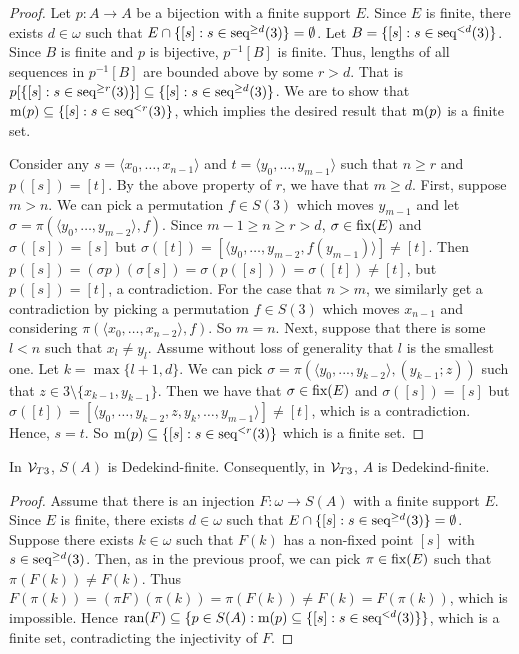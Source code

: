 \begin{proof}
Let $p:A\to A$ be a bijection with a finite support $E$. Since $E$ is finite, there exists $d\in\omega$ such that $E\cap\{[s]:s\in \textup{seq}^{\geq d}(3)\}=\emptyset$.
Let $B=\{[s]:s\in \textup{seq}^{< d}(3)\}$. Since $B$ is finite and $p$ is bijective, $p^{-1}[B]$ is finite. Thus, lengths of all sequences in $p^{-1}[B]$ are bounded above by some $r>d$. That is $p[\{[s]:s\in \textup{seq}^{\geq r}(3)\}]\subseteq \{[s]:s\in \textup{seq}^{\geq d}(3)\}$. We are to show that $\textup{m}(p)\subseteq\{[s]:s\in \textup{seq}^{<r}(3)\}$, which implies the desired result that $\textup{m}(p)$ is a finite set.

Consider any $s=\langle x_{0},\dotsc, x_{n-1}\rangle$ and $t=\langle y_{0},\dotsc, y_{m-1}\rangle$ such that $n\geq r$ and $p([s])=[t]$. By the above property of $r$, we have that $m\geq d$. First, suppose $m>n$. We can pick a permutation $f \in S(3)$ which moves $y_{m-1}$ and let $\sigma=\pi(\langle y_{0},\dotsc, y_{m-2}\rangle,f)$. Since $m-1\geq n\geq r>d$, $\sigma\in \textup{fix}(E)$ and $\sigma([s])=[s]$ but $\sigma([t])=[\langle y_{0},\dotsc,y_{m-2}, f(y_{m-1})\rangle]\neq [t]$. Then $p([s])=(\sigma p)(\sigma[s])=\sigma (p([s]))=\sigma([t])\neq [t]$, but $p([s])=[t]$, a contradiction. For the case that $n>m$, we similarly get a contradiction by picking a permutation $f \in S(3)$ which moves $x_{n-1}$ and considering $\pi(\langle x_{0},\dotsc,x_{n-2}\rangle,f)$. So $m=n$. Next, suppose that there is some $l<n$ such that $x_{l}\neq y_{l}$. Assume without loss of generality that $l$ is the smallest one. Let $k = \max\{l+1,d\}$. 
We can pick $\sigma=\pi(\langle y_0,...,y_{k-2} \rangle, (y_{k-1};z))$ such that $z\in 3\setminus\{x_{k-1},y_{k-1}\}$. Then we have that $\sigma\in\textup{fix}(E)$ and $\sigma([s])=[s]$ but $\sigma([t])=[\langle y_{0},\dotsc,y_{k-2},z,y_{k},\dotsc, y_{m-1}\rangle]\neq [t]$, which is a contradiction. Hence, $s=t$.
So $\textup{m}(p)\subseteq\{[s]:s\in \textup{seq}^{< r}(3)\}$ which is a finite set.
\end{proof}

\begin{lemma}\label{VT3lemma2}
In $\mathcal{V}_{T3}$, $S(A)$ is Dedekind-finite. Consequently, in $\mathcal{V}_{T3}$, $A$ is Dedekind-finite.
\end{lemma}

\begin{proof}
Assume that there is an injection $F:\omega\to S(A)$ with a finite support $E$. Since $E$ is finite, there exists $d\in\omega$ such that $E\cap\{[s]:s\in \textup{seq}^{\geq d}(3)\}=\emptyset$. 
Suppose there exists $k\in\omega$ such that $F(k)$ has a non-fixed point $[s]$ with $s\in \textup{seq}^{\geq d}(3)$. Then, as in the previous proof, we can pick $\pi\in \textup{fix}(E)$ such that $\pi(F(k))\neq F(k)$. Thus $F(\pi(k))=(\pi F)(\pi(k))=\pi(F(k))\neq F(k)=F(\pi(k))$, which is impossible. Hence $\textup{ran}(F)\subseteq \{p\in S(A): \textup{m}(p)\subseteq\{[s]:s\in\textup{seq}^{<d}(3)\} \}$, which is a finite set, contradicting the injectivity of $F$.
\end{proof}

